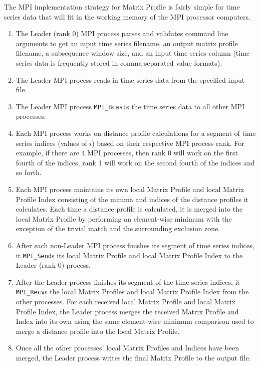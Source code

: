 \documentclass[conference]{IEEEtran}
\begin{document}
The MPI implementation strategy for Matrix Profile is fairly simple for time series data that will fit in the working memory of the MPI processor computers.  
\begin{enumerate}
    \item The Leader (rank 0) MPI process parses and validates command line arguments to get an input time series filename, an output matrix profile filename, a subsequence window size, and an input time series column (time series data is frequently stored in comma-separated value formats).
    \item The Leader MPI process reads in time series data from the specified input file.
    \item The Leader MPI process \texttt{MPI\_Bcast}s the time series data to all other MPI processes.
    \item Each MPI process works on distance profile calculations for a segment of time series indices (values of $i$) based on their respective MPI process rank.  For example, if there are 4 MPI processes, then rank 0 will work on the first fourth of the indices, rank 1 will work on the second fourth of the indices and so forth. 
    \item Each MPI process maintains its own local Matrix Profile and local Matrix Profile Index consisting of the minima and indices of the distance profiles it calculates.  Each time a distance profile is calculated, it is merged into the local Matrix Profile by performing an element-wise minimum with the exception of the trivial match and the surrounding exclusion zone.
    \item After each non-Leader MPI process finishes its segment of time series indices, it \texttt{MPI\_Send}s its local Matrix Profile and local Matrix Profile Index to the Leader (rank 0) process.
    \item After the Leader process finishes its segment of the time series indices, it \texttt{MPI\_Recv}s the local Matrix Profiles and local Matrix Profile Index from the other processes.  For each received local Matrix Profile and local Matrix Profile Index, the Leader process merges the received Matrix Profile and Index into its own using the same element-wise minimum comparison used to merge a distance profile into the local Matrix Profile.

    \item Once all the other processes' local Matrix Profiles and Indices have been merged, the Leader process writes the final Matrix Profile to the output file.
\end{enumerate}
\end{document}
